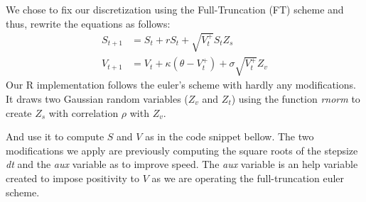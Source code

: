 \documentclass[12pt,twoside]{reedthesis}
\theoremstyle{definition}
\theoremstyle{definition}
\theoremstyle{remark}
\begin{document}
  We chose to fix our discretization using the Full-Truncation (FT) scheme
  and thus, rewrite the equations as follows:
  \begin{align}
  \label{eq:st1}
  S_{t+1} &= S_t + rS_t + \sqrt{V_{t}^{+}} S_t Z_s \\
  \label{eq:vt1}
  V_{t+1} &= V_t + \kappa (\theta - V_{t}^{+}) + \sigma \sqrt{V_{t}^{+}} Z_v 
  \end{align}
  Our R implementation follows the euler's scheme with hardly any
  modifications. It draws two Gaussian random variables (\(Z_v\) and
  \(Z_t\)) using the function \emph{rnorm} to create \(Z_s\) with
  correlation \(\rho\) with \(Z_v\).
  \begin{Shaded}
  \begin{Highlighting}[]
  \StringTok{ }\OperatorTok{::}
  \StringTok{ }\OperatorTok{::}
  \StringTok{ }\OperatorTok{*}\StringTok{ }\OperatorTok{+}\StringTok{ }\NormalTok{(}\NormalTok{(} \OperatorTok{-}\StringTok{ }\OperatorTok{^}\NormalTok{)) }\OperatorTok{*}\StringTok{ }
  \end{Highlighting}
  \end{Shaded}
  And use it to compute \(S\) and \(V\) as in the code snippet bellow. The
  two modifications we apply are previously computing the square roots of
  the stepsize \emph{dt} and the \emph{aux} variable as to improve speed.
  The \emph{aux} variable is an help variable created to impose positivity
  to \(V\) as we are operating the full-truncation euler scheme.
  \begin{Shaded}
  \begin{Highlighting}[]
  \StringTok{ }\OperatorTok{*}\StringTok{ }\NormalTok{(} \OperatorTok{+}\StringTok{ }\OperatorTok{*}\StringTok{ }\OperatorTok{+}\StringTok{ }\OperatorTok{*}\StringTok{ }\OperatorTok{*}\StringTok{ }
  \StringTok{ }\OperatorTok{+}\StringTok{ }\OperatorTok{*}\StringTok{ }\OperatorTok{*}\StringTok{ }\OperatorTok{-}\StringTok{ }\OperatorTok{+}\StringTok{ }
  \StringTok{                     }\OperatorTok{*}\StringTok{ }\OperatorTok{*}\StringTok{ }\OperatorTok{*}\StringTok{ }
  \end{Highlighting}
  \end{Shaded}
\end{document}
